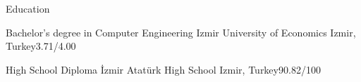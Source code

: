 \begin{Section}{Education}

    {Bachelor's degree in Computer Engineering}
    {Izmir University of Economics}
    {Izmir, Turkey}{3.71/4.00}

    {High School Diploma}
    {İzmir Atatürk High School}
    {Izmir, Turkey}{90.82/100}

\end{Section}